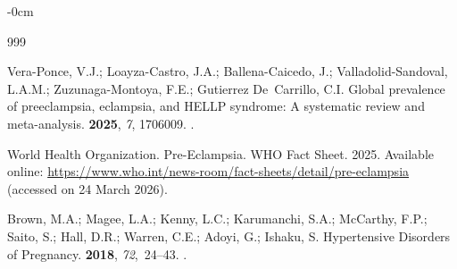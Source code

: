 \documentclass[diagnostics,article,accept,pdftex,moreauthors]{Definitions/mdpi}
\begin{document}
\begin{adjustwidth}{-\extralength}{0cm}



%
\begin{thebibliography}{999}

Vera-Ponce, V.J.; Loayza-Castro, J.A.; Ballena-Caicedo, J.;
  Valladolid-Sandoval, L.A.M.; Zuzunaga-Montoya, F.E.; Gutierrez De~Carrillo,
  C.I.
\newblock Global prevalence of preeclampsia, eclampsia, and HELLP syndrome: A
  systematic review and meta-analysis.
 {\bf 2025}, {\em  7}, 1706009.
.

{World Health Organization}.
\newblock Pre-Eclampsia.   
\newblock WHO Fact Sheet. 2025.
\newblock Available online:
\url{https://www.who.int/news-room/fact-sheets/detail/pre-eclampsia}
{(accessed on 24 March 2026).} %

 

Brown, M.A.; Magee, L.A.; Kenny, L.C.; Karumanchi, S.A.; McCarthy, F.P.; Saito,
  S.; Hall, D.R.; Warren, C.E.; Adoyi, G.; Ishaku, S.
\newblock Hypertensive Disorders of Pregnancy.
 {\bf 2018}, {\em 72},~24--43.
.


\end{thebibliography}
\end{adjustwidth}
\end{document}
